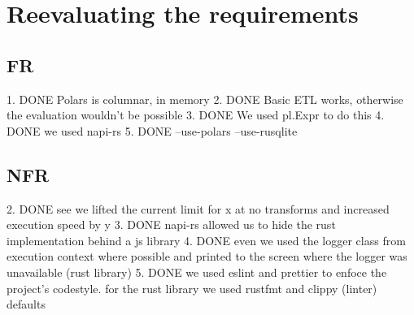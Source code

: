 \section{Reevaluating the requirements}
\subsection{FR}
1. DONE Polars is columnar, in memory
2. DONE Basic ETL works, otherwise the evaluation wouldn't be possible
3. DONE We used pl.Expr to do this
4. DONE we used napi-rs
5. DONE --use-polars --use-rusqlite
\subsection{NFR}
2. DONE see we lifted the current limit for x at no transforms and increased execution speed by y
3. DONE napi-rs allowed us to hide the rust implementation behind a js library
4. DONE even we used the logger class from execution context where possible and printed to the screen where the logger was unavailable (rust library)
5. DONE we used eslint and prettier to enfoce the project's codestyle. for the rust library we used rustfmt and clippy (linter) defaults

